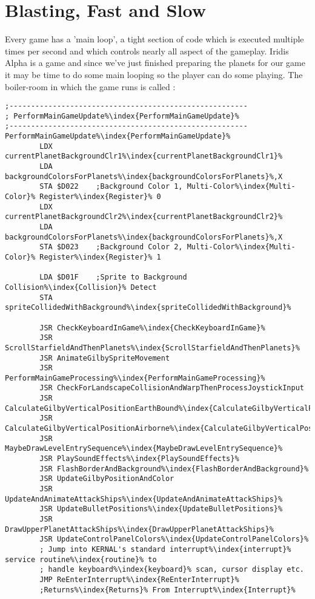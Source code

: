 \chapter{Blasting, Fast and Slow} 
\label{sec:blast}
\lstset{style=6502Style}

Every game has a 'main loop', a tight section of code which is executed multiple times
per second and which controls nearly all aspect of the gameplay. Iridis Alpha is a game
and since we've just finished preparing the planets for our game it may be time to
do some main looping so the player can do some playing. The 
boiler-room in which the game runs is called :

\begin{lstlisting}[escapechar=\%,caption=\icode{PerformMainGameUpdate\index{PerformMainGameUpdate}}. This is the spaghetti junction handling nearly everything
during main gameplay.]
;-------------------------------------------------------
; PerformMainGameUpdate%\index{PerformMainGameUpdate}%
;-------------------------------------------------------
PerformMainGameUpdate%\index{PerformMainGameUpdate}%
        LDX currentPlanetBackgroundClr1%\index{currentPlanetBackgroundClr1}%
        LDA backgroundColorsForPlanets%\index{backgroundColorsForPlanets}%,X
        STA $D022    ;Background Color 1, Multi-Color%\index{Multi-Color}% Register%\index{Register}% 0
        LDX currentPlanetBackgroundClr2%\index{currentPlanetBackgroundClr2}%
        LDA backgroundColorsForPlanets%\index{backgroundColorsForPlanets}%,X
        STA $D023    ;Background Color 2, Multi-Color%\index{Multi-Color}% Register%\index{Register}% 1

        LDA $D01F    ;Sprite to Background Collision%\index{Collision}% Detect
        STA spriteCollidedWithBackground%\index{spriteCollidedWithBackground}%

        JSR CheckKeyboardInGame%\index{CheckKeyboardInGame}%
        JSR ScrollStarfieldAndThenPlanets%\index{ScrollStarfieldAndThenPlanets}%
        JSR AnimateGilbySpriteMovement
        JSR PerformMainGameProcessing%\index{PerformMainGameProcessing}%
        JSR CheckForLandscapeCollisionAndWarpThenProcessJoystickInput
        JSR CalculateGilbyVerticalPositionEarthBound%\index{CalculateGilbyVerticalPositionEarthBound}%
        JSR CalculateGilbyVerticalPositionAirborne%\index{CalculateGilbyVerticalPositionAirborne}%
        JSR MaybeDrawLevelEntrySequence%\index{MaybeDrawLevelEntrySequence}%
        JSR PlaySoundEffects%\index{PlaySoundEffects}%
        JSR FlashBorderAndBackground%\index{FlashBorderAndBackground}%
        JSR UpdateGilbyPositionAndColor
        JSR UpdateAndAnimateAttackShips%\index{UpdateAndAnimateAttackShips}%
        JSR UpdateBulletPositions%\index{UpdateBulletPositions}%
        JSR DrawUpperPlanetAttackShips%\index{DrawUpperPlanetAttackShips}%
        JSR UpdateControlPanelColors%\index{UpdateControlPanelColors}%
        ; Jump into KERNAL's standard interrupt%\index{interrupt}% service routine%\index{routine}% to 
        ; handle keyboard%\index{keyboard}% scan, cursor display etc.
        JMP ReEnterInterrupt%\index{ReEnterInterrupt}% 
        ;Returns%\index{Returns}% From Interrupt%\index{Interrupt}%
\end{lstlisting}

